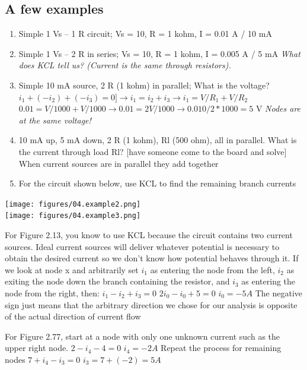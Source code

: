 \documentclass[11pt]{book}
\begin{document}
\subsection{A few examples}
\begin{enumerate}
	\item Simple 1 Vs – 1 R circuit; Vs = 10, R = 1 kohm, I = 0.01 A / 10 mA
	\item Simple 1 Vs – 2 R in series; Vs = 10, R = 1 kohm, I = 0.005 A / 5 mA
	\subitem \textit{What does KCL tell us? (Current is the same through  resistors). }
	\item Simple 10 mA source, 2 R (1 kohm) in parallel; What is the voltage?
	\subitem $i_1 + (-i_2) + (-i_3) = 0 ] \rightarrow i_1 = i_2 + i_3 \rightarrow i_1 = V/R_1 + V/R_2$ 
	\subitem $0.01 = V/1000 + V/1000 \rightarrow 0.01 = 2V/1000 \rightarrow 0.010/2*1000 = 5$ V
	\subitem \textit{Nodes are at the same voltage!}
	\item 10 mA up, 5 mA down, 2 R (1 kohm), Rl (500 ohm), all in parallel. What is the current through load Rl? [have someone come to the board and solve]
	\subitem When current sources are in parallel they add together 
	\item For the circuit shown below, use KCL to find the remaining branch currents
\end{enumerate}

\begin{center}
	\texttt{[image: figures/04.example2.png]}
\\
\texttt{[image: figures/04.example3.png]}

\end{center}

For Figure 2.13, you know to use KCL because the circuit contains two current sources. Ideal current sources will deliver whatever potential is necessary to obtain the desired current so we don't know how potential behaves through it.
If we look at node x and arbitrarily set $i_1$ as entering the node from the left, $i_2$ as exiting the node down the branch containing the resistor, and $i_3$ as entering the node from the right, then:
\subitem $i_1 - i_2 + i_3 = 0$
\subitem $2i_0 - i_0 + 5 = 0$
\subitem $i_0 = - 5 A $
The negative sign just means that the arbitrary direction we chose for our analysis is opposite of the actual direction of current flow

For Figure 2.77, start at a node with only one unknown current such as the upper right node.
\subitem $2 - i_4 - 4 = 0$
\subitem $i_4 = -2 A$
Repeat the process for remaining nodes
\subitem $7 + i_4 - i_3 = 0$
\subitem $i_3 = 7 + (-2) = 5 A$
\end{document}
